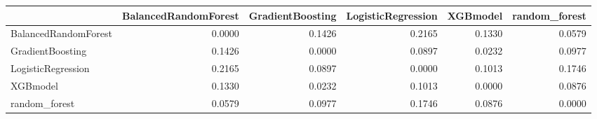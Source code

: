 \begin{tabular}{lrrrrr}
\toprule
 & BalancedRandomForest & GradientBoosting & LogisticRegression & XGBmodel & random_forest \\
\midrule
BalancedRandomForest & 0.0000 & 0.1426 & 0.2165 & 0.1330 & 0.0579 \\
GradientBoosting & 0.1426 & 0.0000 & 0.0897 & 0.0232 & 0.0977 \\
LogisticRegression & 0.2165 & 0.0897 & 0.0000 & 0.1013 & 0.1746 \\
XGBmodel & 0.1330 & 0.0232 & 0.1013 & 0.0000 & 0.0876 \\
random_forest & 0.0579 & 0.0977 & 0.1746 & 0.0876 & 0.0000 \\
\bottomrule
\end{tabular}
